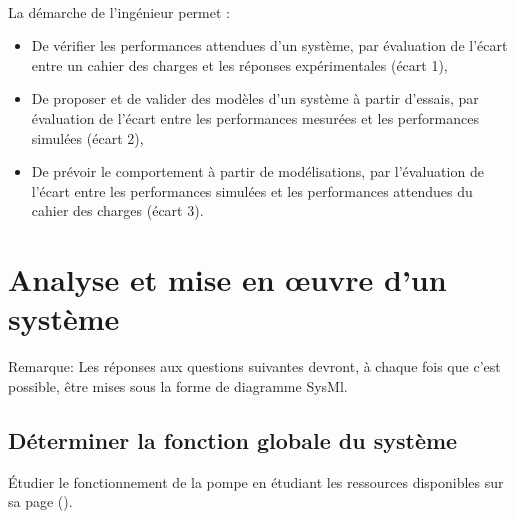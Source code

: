 


 \\

\graphicspath{{../../../img/}}
\begin{center}
\def\svgwidth{\columnwidth}

\end{center}

La démarche de l’ingénieur permet :
\begin{itemize}
 \item De vérifier les performances attendues d’un système, par évaluation de l’écart entre un cahier des charges et les réponses expérimentales (écart 1),
 \item De proposer et de valider des modèles d’un système à partir d’essais, par évaluation de l’écart entre les performances mesurées et les performances simulées (écart 2),
 \item De prévoir le comportement à partir de modélisations, par l’évaluation de l’écart entre les performances simulées et les performances attendues du cahier des charges (écart 3).
\end{itemize}


\newpage

\section{Analyse et mise en \oe uvre d'un système} 

Remarque: Les réponses aux questions suivantes devront, à chaque fois que c'est possible, être mises sous la forme de diagramme SysMl.

\subsection{Déterminer la fonction globale du système} 

Étudier le fonctionnement de la pompe en étudiant les ressources disponibles sur sa page (\urlsysteme).


